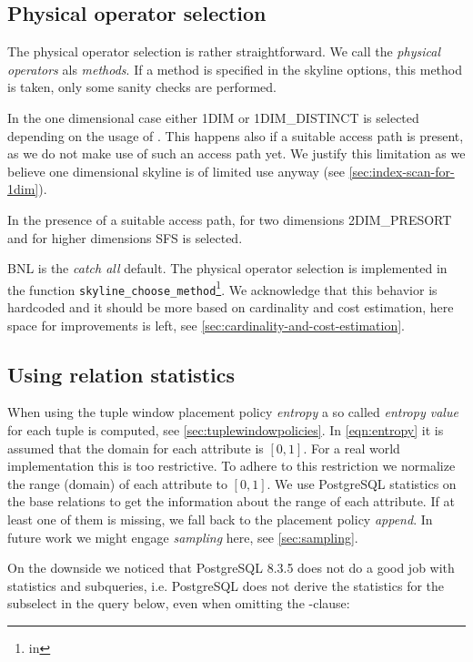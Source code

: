 \subsection{Physical operator selection}
\label{sec:operatorselection}
The physical operator selection is rather straightforward.  We call
the \emph{physical operators} als \emph{methods}.  If a method is
specified in the skyline options, this method is taken, only some
sanity checks are performed.

In the one dimensional case either 1DIM or 1DIM\_DISTINCT is selected
depending on the usage of .  This
happens also if a suitable access path is present, as we do not make
use of such an access path yet.  We justify this limitation as we
believe one dimensional skyline is of limited use anyway (see
\autoref{sec:index-scan-for-1dim}).

In the presence of a suitable access path, for two dimensions
2DIM\_PRESORT and for higher dimensions SFS is selected.

BNL is the \emph{catch all} default. The physical operator selection
is implemented in the function \texttt{skyline\_choose\_method}\footnote{in
}.  We acknowledge that
this behavior is hardcoded and it should be more based on cardinality
and cost estimation, here space for improvements is left, see
\autoref{sec:cardinality-and-cost-estimation}.


\subsection{Using relation statistics}
\label{sec:using-relation-statistics}
When using the tuple window placement policy \emph{entropy} a so
called \emph{entropy value} for each tuple is computed, see
\autoref{sec:tuplewindowpolicies}.
In \eqref{eqn:entropy} it is assumed that the domain for each
attribute is $[0, 1]$.  For a real world implementation this
is too restrictive.  To adhere to this restriction
we normalize the range (domain) of each attribute to $[0,1]$.
We use PostgreSQL statistics on the base relations to get the
information about the range of each attribute.  If at least one of
them is missing, we fall back to the placement policy \emph{append}.  In
future work we might engage \emph{sampling} here, see
\autoref{sec:sampling}.

On the downside we noticed that PostgreSQL 8.3.5 does not do a good job
with statistics and subqueries, i.e. PostgreSQL does not derive the
statistics for the subselect in the query below, even when omitting the 
-clause:

